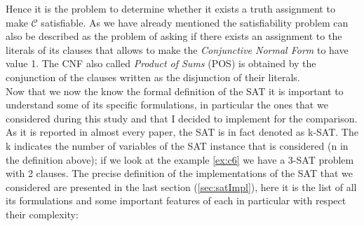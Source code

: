 \documentclass[english]{article}
\begin{document}
			Hence it is the problem to determine whether it exists a truth assignment to make $\mathcal{C}$ satisfiable. As we have already mentioned the satisfiability problem can also be described as the problem of asking if there exists an assignment to the literals of its clauses that allows to make the \emph{Conjunctive Normal Form} to have value 1. The CNF also called \emph{Product of Sums} (POS) is obtained by the conjunction of the clauses written as the disjunction of their literals. \\
			
			Now that we now the know the formal definition of the SAT it is important to understand some of its specific formulations, in particular the ones that we considered during this study and that I decided to implement for the comparison. As it is reported in almost every paper, the SAT is in fact denoted as k-SAT. The k indicates the number of variables of the SAT instance that is considered (n in the definition above); if we look at the example \ref{ex:c6} we have a 3-SAT problem with 2 clauses. The precise definition of the implementations of the SAT that we considered are presented in the last section (\ref{sec:satImpl}), here it is the list of all its formulations and some important features of each in particular with respect their complexity:
			
\end{document}
